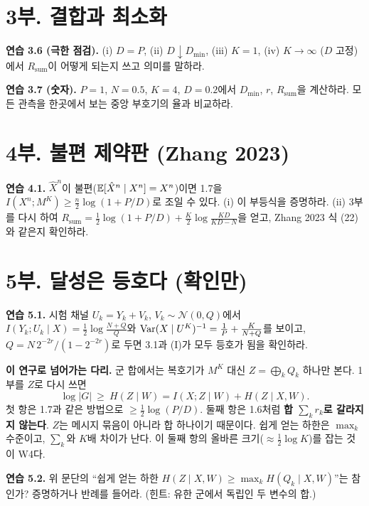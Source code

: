 \section*{3부. 결합과 최소화}

\textbf{연습 3.6 (극한 점검).} (i) $D=P$, (ii) $D\downarrow D_{\min}$, (iii) $K=1$, (iv) $K\to\infty$ ($D$ 고정)에서 $R_{\mathrm{sum}}$이 어떻게 되는지 쓰고 의미를 말하라.
\vspace{4em}

\textbf{연습 3.7 (숫자).} $P=1$, $N=0.5$, $K=4$, $D=0.2$에서 $D_{\min}$, $r$, $R_{\mathrm{sum}}$을 계산하라. 모든 관측을 한곳에서 보는 중앙 부호기의 율과 비교하라. \hfill\blank

\section*{4부. 불편 제약판 (Zhang 2023)}
\textbf{연습 4.1.} $\hat X^n$이 불편($\mathbb{E}[\hat X^n\mid X^n]=X^n$)이면 1.7을 $I(X^n;M^K)\ge\frac n2\log(1+P/D)$로 조일 수 있다. (i) 이 부등식을 증명하라. (ii) 3부를 다시 하여 $R_{\mathrm{sum}}=\frac12\log(1+P/D)+\frac K2\log\frac{KD}{KD-N}$을 얻고, Zhang 2023 식 (22)와 같은지 확인하라.
\vspace{5em}

\section*{5부. 달성은 등호다 (확인만)}
\textbf{연습 5.1.} 시험 채널 $U_k=Y_k+V_k$, $V_k\sim\mathcal N(0,Q)$에서 $I(Y_k;U_k\mid X)=\frac12\log\frac{N+Q}Q$와 $\operatorname{Var}(X\mid U^K)^{-1}=\frac1P+\frac K{N+Q}$를 보이고, $Q=N\,2^{-2r}/(1-2^{-2r})$로 두면 3.1과 (I)가 모두 등호가 됨을 확인하라.
\vspace{4em}

\begin{bridge}
\textbf{이 연구로 넘어가는 다리.} 군 합에서는 복호기가 $M^K$ 대신 $Z=\bigoplus_kQ_k$ 하나만 본다. 1부를 $Z$로 다시 쓰면
\[
\log|G|\ \ge\ H(Z\mid W)=I(X;Z\mid W)+H(Z\mid X,W).
\]
첫 항은 1.7과 같은 방법으로 $\ge\frac12\log(P/D)$. 둘째 항은 1.6처럼 \textbf{합 $\sum_kr_k$로 갈라지지 않는다}. $Z$는 메시지 묶음이 아니라 합 하나이기 때문이다. 쉽게 얻는 하한은 $\max_k$ 수준이고, $\sum_k$와 $K$배 차이가 난다. 이 둘째 항의 올바른 크기($\approx\frac12\log K$)를 잡는 것이 W4다.

\textbf{연습 5.2.} 위 문단의 “쉽게 얻는 하한 $H(Z\mid X,W)\ge\max_k H(Q_k\mid X,W)$”는 참인가? 증명하거나 반례를 들어라. (힌트: 유한 군에서 독립인 두 변수의 합.)
\vspace{3em}
\end{bridge}

